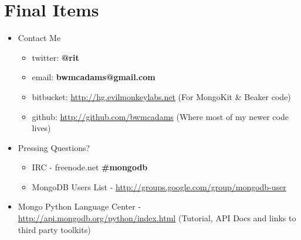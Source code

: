 \documentclass{beamer}
\newenvironment{itemizeframe}
               {\begin{frame}\startitemizeframe} 
               {\stopitemizeframe\end{frame}}
\newcommand\startitemizeframe{\begin{itemize}} \newcommand\stopitemizeframe{\end{itemize}}
\begin{document}
\section{Final Items}


\begin{itemizeframe}
    \frametitle{Questions?}
    \framesubtitle{Contact Info}
    \item Contact Me
    \begin{itemize}
        \item twitter: {\bf @rit}
        \item email: {\bf bwmcadams@gmail.com}	
		\item bitbucket: \url{http://hg.evilmonkeylabs.net} (For MongoKit \& Beaker code)
		\item github: \url{http://github.com/bwmcadams} (Where most of my newer code lives)
    \end{itemize}
    \item Pressing Questions?
    \begin{itemize}
        \item IRC - {freenode.net \bf\#mongodb}
        \item MongoDB Users List - \url{http://groups.google.com/group/mongodb-user}
    \end{itemize}
\item Mongo Python Language Center - \url{http://api.mongodb.org/python/index.html} {(\tiny Tutorial, API Docs and links to third party toolkits)}
\end{itemizeframe}
\end{document}
